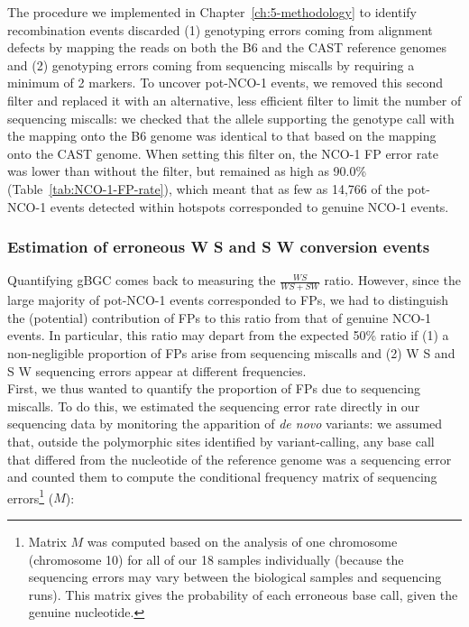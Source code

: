 The procedure we implemented in Chapter~\ref{ch:5-methodology} to identify recombination events discarded (1) genotyping errors coming from alignment defects by mapping the reads on both the B6 and the CAST reference genomes and (2) genotyping errors coming from sequencing miscalls by requiring a minimum of 2 markers.
To uncover pot-NCO-1 events, we removed this second filter and replaced it with an alternative, less efficient filter to limit the number of sequencing miscalls: we checked that the allele supporting the genotype call with the mapping onto the B6 genome was identical to that based on the mapping onto the CAST genome.
When setting this filter on, the NCO-1 FP error rate was lower than without the filter, but remained as high as 90.0\% (Table~\ref{tab:NCO-1-FP-rate}), which meant that as few as 14,766 of the pot-NCO-1 events detected within hotspots corresponded to genuine NCO-1 events.



\subsubsection{Estimation of erroneous W\textrightarrow{} S and S\textrightarrow{} W conversion events}

Quantifying gBGC comes back to measuring the $\frac{WS}{WS+SW}$ ratio.
However, since the large majority of pot-NCO-1 events corresponded to FPs, we had to distinguish the (potential) contribution of FPs to this ratio from that of genuine NCO-1 events.
In particular, this ratio may depart from the expected 50\% ratio if (1) a non-negligible proportion of FPs arise from sequencing miscalls and (2) W\textrightarrow{} S and S\textrightarrow{} W sequencing errors appear at different frequencies.\\

First, we thus wanted to quantify the proportion of FPs due to sequencing miscalls.
To do this, we estimated the sequencing error rate directly in our sequencing data by monitoring the apparition of \textit{de novo} variants:
we assumed that, outside the polymorphic sites identified by variant-calling, any base call that differed from the nucleotide of the reference genome was a sequencing error and counted them to compute the conditional frequency matrix of sequencing errors\footnote{Matrix $M$ was computed based on the analysis of one chromosome (chromosome 10) for all of our 18 samples individually (because the sequencing errors may vary between the biological samples and sequencing runs). This matrix gives the probability of each erroneous base call, given the genuine nucleotide.} ($M$):

